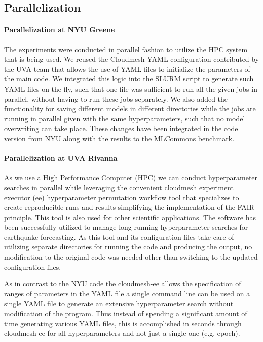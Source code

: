 \documentclass[sigplan,screen]{acmart}
\begin{document}
\subsection{Parallelization}
\label{sec:parallel}


\paragraph{Parallelization at NYU Greene} The experiments were conducted in parallel fashion to utilize the HPC system that is being used. We reused the Cloudmesh YAML configuration contributed by the UVA team 
that allows the use of YAML files to initialize the parameters of the main code.
We integrated this logic into the SLURM script to generate such YAML files 
on the fly, such that one file was sufficient to run all the given jobs in parallel, without having to run these jobs separately. We also added the functionality for saving different models in different directories while the jobs are running in parallel given with the same hyperparameters, such that no model overwriting can take place. These changes have been integrated in the code version from NYU along with the results to the MLCommons benchmark.


\paragraph{Parallelization at UVA Rivanna} As we use a High Performance Computer (HPC) we can conduct hyperparameter searches in parallel while leveraging the convenient cloudmesh experiment executor (ee)  hyperparameter permutation workflow tool \cite{las-2023-ai-workflow,github-cloudmesh-ee,las-2023-mlcommons-edu-eq} that specializes to create reproducible runs and results simplifying the implementation of the FAIR principle. This tool is also used for other scientific applications. The software has been successfully utilized to manage long-running hyperparameter searches for earthquake forecasting. As this tool and its configuration files take care of utilizing separate directories for running the code and producing the output, no modification to the original code was needed other than switching to the updated configuration files. 

As in contrast to the NYU code the cloudmesh-ee allows the specification of ranges of parameters in the YAML file a single command line can be used on a single YAML file to generate an extensive hyperparameter search without modification of the program. Thus instead of spending a significant amount of time generating various YAML files, this is accomplished in seconds through cloudmesh-ee for all hyperparameters and not just a single one (e.g. epoch).
\end{document}
